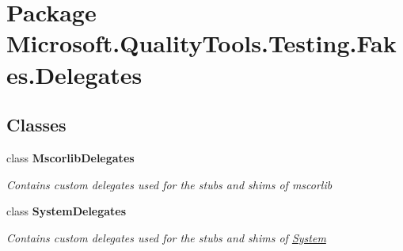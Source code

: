 \hypertarget{namespace_microsoft_1_1_quality_tools_1_1_testing_1_1_fakes_1_1_delegates}{\section{Package Microsoft.\-Quality\-Tools.\-Testing.\-Fakes.\-Delegates}
\label{namespace_microsoft_1_1_quality_tools_1_1_testing_1_1_fakes_1_1_delegates}
}
\subsection*{Classes}
\begin{DoxyCompactItemize}
\item 
class {\bfseries Mscorlib\-Delegates}
\begin{DoxyCompactList}\small\item\em Contains custom delegates used for the stubs and shims of mscorlib\end{DoxyCompactList}\item 
class {\bfseries System\-Delegates}
\begin{DoxyCompactList}\small\item\em Contains custom delegates used for the stubs and shims of \hyperlink{namespace_system}{System}\end{DoxyCompactList}\end{DoxyCompactItemize}
